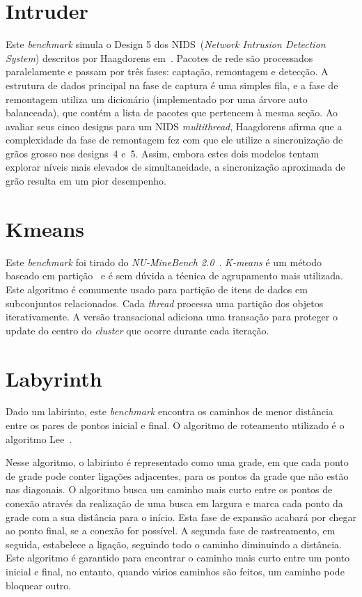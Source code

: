 \documentclass[diss,capa]{texufpel}
\begin{document}
\section{\textbf{Intruder}}

Este \emph{benchmark} simula o Design 5 dos NIDS~(\emph{Network Intrusion Detection System}) descritos por Haagdorens em~\cite{Haagdorens05}. Pacotes de rede são processados paralelamente e passam por três fases: captação, remontagem e detecção. A estrutura de dados principal na fase de captura é uma simples fila, e a fase de remontagem utiliza um dicionário (implementado por uma árvore auto balanceada), que contém a lista de pacotes que pertencem à mesma seção. Ao avaliar seus cinco designs para um NIDS \emph{multithread}, Haagdorens afirma que a complexidade da fase de remontagem fez com que ele utilize a sincronização de grãos grosso nos designs~4 e~5. Assim, embora estes dois modelos tentam explorar níveis mais elevados de simultaneidade, a sincronização aproximada de grão resulta em um pior desempenho.


\section{\textbf{Kmeans}}

Este \emph{benchmark} foi tirado do \emph{NU-MineBench 2.0}~\cite{Pisharath05}. \emph{K-means} é um método baseado em partição~\cite{Bezdek81} e é sem dúvida a técnica de agrupamento mais utilizada. Este algoritmo é comumente usado para partição de itens de dados em subconjuntos relacionados. Cada \emph{thread} processa uma partição dos objetos iterativamente. A versão transacional adiciona uma transação para proteger o update do centro do \emph{cluster} que ocorre durante cada iteração.


\section{\textbf{Labyrinth}}

Dado um labirinto, este \emph{benchmark} encontra os caminhos de menor distância entre os pares de pontos inicial e final. O algoritmo de roteamento utilizado é o algoritmo Lee~\cite{Lee61}.

Nesse algoritmo, o labirinto é representado como uma grade, em que cada ponto de grade pode conter ligações adjacentes, para os pontos da grade que não estão nas diagonais. O algoritmo busca um caminho mais curto entre os pontos de conexão através da realização de uma busca em largura e marca cada ponto da grade com a sua distância para o início. Esta fase de expansão acabará por chegar ao ponto final, se a conexão for possível. A segunda fase de rastreamento, em seguida, estabelece a ligação, seguindo todo o caminho diminuindo a distância. Este algoritmo é garantido para encontrar o caminho mais curto entre um ponto inicial e final, no entanto, quando vários caminhos são feitos, um caminho pode bloquear outro.
\end{document}
